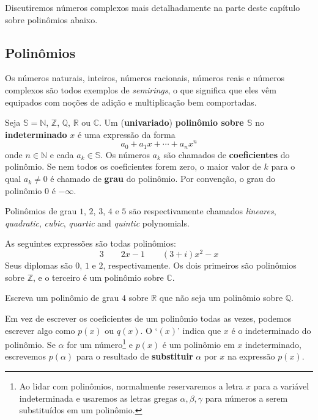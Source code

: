 Discutiremos números complexos mais detalhadamente na parte deste capítulo sobre polinômios abaixo.

\subsection*{Polinômios}
\label{pGettingStartedPolynomials}

Os números naturais, inteiros, números racionais, números reais e números complexos são todos exemplos de \textit{semirings}, o que significa que eles vêm equipados com noções de adição e multiplicação bem comportadas.

\begin{definition}
\label{defPolynomialPreliminary}
Seja $\mathbb{S} = \mathbb{N}$, $\mathbb{Z}$, $\mathbb{Q}$, $\mathbb{R}$ ou $\mathbb{C}$. Um (\textbf{univariado}) \textbf{polinômio sobre $\mathbb{S}$} no \textbf{indeterminado} $x$ é uma expressão da forma
\[ a_0 + a_1x + \cdots + a_nx^n \]
onde $n \in \mathbb{N}$ e cada $a_k \in \mathbb{S}$. Os números $a_k$ são chamados de \textbf{coeficientes} do polinômio. Se nem todos os coeficientes forem zero, o maior valor de $k$ para o qual $a_k \ne 0$ é chamado de \textbf{grau} do polinômio. Por convenção, o grau do polinômio $0$ é $-\infty$.
\end{definition}

Polinômios de grau $1$, $2$, $3$, $4$ e $5$ são respectivamente chamados \textit{lineares}, \textit{quadratic}, \textit{cubic}, \textit{quartic} and \textit{quintic} polynomials.

\begin{example}
As seguintes expressões são todas polinômios:
\[ 3 \qquad 2x-1 \qquad (3+i)x^2-x \]
Seus diplomas são $0$, $1$ e $2$, respectivamente. Os dois primeiros são polinômios sobre $\mathbb{Z}$, e o terceiro é um polinômio sobre $\mathbb{C}$.
\end{example}

\begin{exercise}
Escreva um polinômio de grau $4$ sobre $\mathbb{R}$ que não seja um polinômio sobre $\mathbb{Q}$.
\end{exercise}

\begin{notation}
Em vez de escrever os coeficientes de um polinômio todas as vezes, podemos escrever algo como $p(x)$ ou $q(x)$. O `$(x)$' indica que $x$ é o indeterminado do polinômio. Se $\alpha$ for um número\footnote{Ao lidar com polinômios, normalmente reservaremos a letra $x$ para a variável indeterminada e usaremos as letras gregas $\alpha,\beta,\gamma$  para números a serem substituídos em um polinômio.} e $p(x)$ é um polinômio em $x$ indeterminado, escrevemos $p(\alpha)$ para o resultado de \textbf{substituir} $\alpha$ por $x$ na expressão $p(x)$.
\end{notation}

